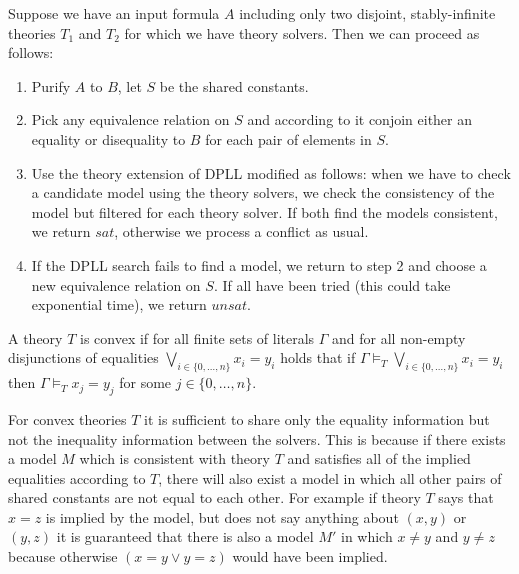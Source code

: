 \begin{mytitle} Suppose we have an input formula $A$ including only two disjoint, stably-infinite theories $T_1$ and $T_2$ for which we have theory solvers. Then we can proceed as follows:
\begin{enumerate}
    \item Purify $A$ to $B$, let $S$ be the shared constants.
    \item Pick any equivalence relation on $S$ and according to it conjoin either an equality or disequality to $B$ for each pair of elements in $S$.
    \item Use the theory extension of DPLL modified as follows: when we have to check a candidate model using the theory solvers, we check the consistency of the model but filtered for each theory solver. If both find the models consistent, we return $sat$, otherwise we process a conflict as usual.
    \item If the DPLL search fails to find a model, we return to step 2 and choose a new equivalence relation on $S$. If all have been tried (this could take exponential time), we return $unsat$.
\end{enumerate}
\end{mytitle}
\begin{mytitle}[Convexity] A theory $T$ is convex if for all finite sets of literals $\Gamma$ and for all non-empty disjunctions of equalities $\bigvee_{i\in\{0,\ldots, n\}}x_i=y_i$ holds that if $\Gamma \models_T \bigvee_{i\in\{0,\ldots, n\}}x_i=y_i$ then $\Gamma \models_T x_j=y_j$ for some $j\in \{0, \ldots, n\}$.
\end{mytitle}
\begin{mytitle} For convex theories $T$ it is sufficient to share only the equality information but not the inequality information between the solvers. This is because if there exists a model $M$ which is consistent with theory $T$ and satisfies all of the implied equalities according to $T$, there will also exist a model in which all other pairs of shared constants are not equal to each other. For example if theory $T$ says that $x=z$ is implied by the model, but does not say anything about $(x,y)$ or $(y,z)$ it is guaranteed that there is also a model $M'$ in which $x\neq y$ and $y\neq z$ because otherwise $(x=y \lor y=z)$ would have been implied.
\end{mytitle}
